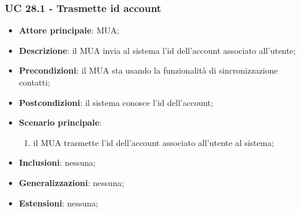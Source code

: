     \subsubsection{UC 28.1 - Trasmette id account} \label{sec:UC28.1}
    \begin{itemize}
        \item \textbf{Attore principale}: MUA;
        \item \textbf{Descrizione}: il MUA invia al sistema l'id dell'account associato all'utente;
        \item \textbf{Precondizioni}: il MUA sta usando la funzionalità di sincronizzazione contatti;
        \item \textbf{Postcondizioni}: il sistema conosce l'id dell'account;
        \item \textbf{Scenario principale}:
            \begin{enumerate}
                \item il MUA trasmette l'id dell'account associato all'utente al sistema;
            \end{enumerate}
        \item \textbf{Inclusioni}: nessuna;
        \item \textbf{Generalizzazioni}: nessuna;
        \item \textbf{Estensioni}: nessuna;
    \end{itemize}

